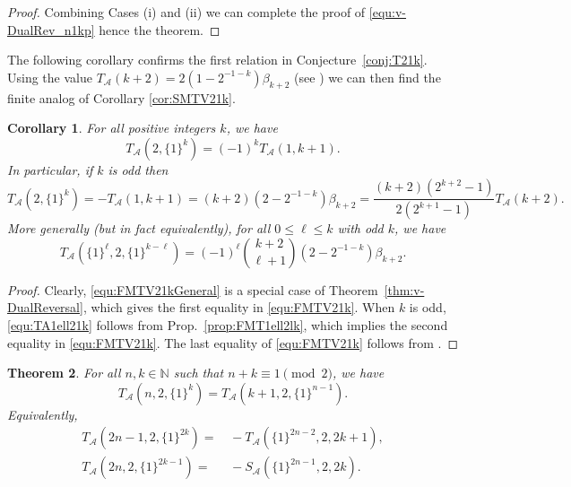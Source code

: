 \documentclass{article}
\newcommand{\calA}{\mathcal{A}}
\theoremstyle{plain}
\newtheorem{thm}{Theorem}[section]
\newtheorem{cor}[thm]{Corollary}
\theoremstyle{definition}
\begin{document}
\begin{proof}
\medskip
Combining Cases (i) and (ii) we can complete the proof of \eqref{equ:v-DualRev_n1kp} hence the theorem.
\end{proof}


The following corollary confirms the first relation in Conjecture~\ref{conj:T21k}. Using the value $T_\calA(k+2)=2(1-2^{-1-k}) \beta_{k+2}$ (see \cite[(37)]{Zhao2024a}) we can then find the finite analog of Corollary \ref{cor:SMTV21k}.

\begin{cor}\label{cor:TA21_k}
For all positive integers $k$, we have
\begin{equation}\label{equ:FMTV21kGeneral}
T_{\calA}(2,\{1\}^k)=(-1)^k T_{\calA}(1,k+1).
\end{equation}
In particular, if $k$ is odd then
\begin{equation}\label{equ:FMTV21k}
T_{\calA}(2,\{1\}^k)=-T_{\calA}(1,k+1)=(k+2)(2-2^{-1-k})\beta_{k+2} =\frac{(k+2)(2^{k+2}-1)}{2(2^{k+1}-1)}T_\calA(k+2).
\end{equation}
More generally (but in fact equivalently), for all $0\le\ell\le k$ with odd $k$, we have
\begin{equation}\label{equ:TA1ell21k}
T_\calA(\{1\}^\ell,2,\{1\}^{k-\ell})=(-1)^{\ell}\binom{k+2}{\ell+1} (2-2^{-1-k}) \beta_{k+2}.
\end{equation}
\end{cor}

\begin{proof}
Clearly, \eqref{equ:FMTV21kGeneral} is a special case of Theorem~\ref{thm:v-DualReversal}, which gives the first equality in \eqref{equ:FMTV21k}. When $k$ is odd, \eqref{equ:TA1ell21k} follows from Prop.~\ref{prop:FMT1ell2lk}, which implies the second equality
in \eqref{equ:FMTV21k}. The last equality of \eqref{equ:FMTV21k} follows from \cite[(42)]{Zhao2024a}.
\end{proof}

\begin{thm}\label{thm:ht2FMTVdual}
For all $n,k\in \mathbb N$ such that $n+k\equiv 1\pmod 2$, we have
\begin{equation*}
T_\calA(n,2,\{1\}^{k})=T_\calA(k+1,2,\{1\}^{n-1}).
\end{equation*}
Equivalently,
\begin{align}\label{equ:ht2FMTVdual-nOdd}
T_\calA(2n-1,2,\{1\}^{2k})=&\, -T_\calA(\{1\}^{2n-2},2,2k+1),\\
T_\calA(2n,2,\{1\}^{2k-1})=&\, -S_\calA(\{1\}^{2n-1},2,2k).\label{equ:ht2FMTVdual-nEven}
\end{align}
\end{thm}
\end{document}
